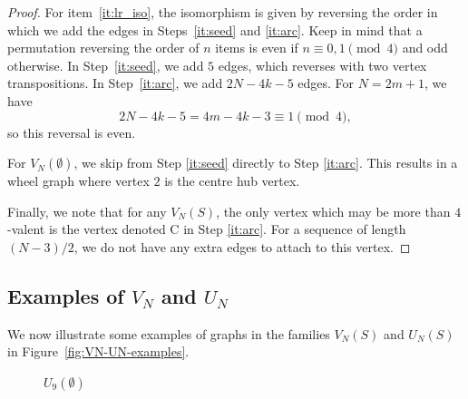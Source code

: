 \documentclass[11pt]{article}
\theoremstyle{definition}
\theoremstyle{plain}
\begin{document}
\begin{proof}


For item~\ref{it:lr_iso}, the isomorphism is given by reversing the order in which we add the edges in Steps~\ref{it:seed} and \ref{it:arc}. Keep in mind that a permutation reversing the order of $n$ items is even if $n \equiv 0,1 \pmod{4}$ and odd otherwise.
In Step~\ref{it:seed}, we add $5$ edges, which reverses with two vertex transpositions.
In Step~\ref{it:arc}, we add $2N-4k-5$ edges. For $N=2m+1$, we have
\[
2N-4k-5 = 4m-4k-3 \equiv 1 \pmod{4},
\]
so this reversal is even.
 
For $V_N(\emptyset)$, we skip from Step \ref{it:seed} directly to Step \ref{it:arc}. This results in a wheel graph where vertex $2$ is the centre hub vertex. 

Finally, we note that for any $V_N(S)$, the only vertex which may be more than $4$-valent is the vertex denoted C in Step \ref{it:arc}.
For a sequence of length $(N-3)/2$, we do not have any extra edges to attach to this vertex. 


\end{proof}

\subsection*{Examples of $V_N$ and $U_N$}

We now illustrate some examples of graphs in the families $V_N(S)$ and $U_N(S)$ in Figure~\ref{fig:VN-UN-examples}.

\begin{figure}[H]
\centering
\begin{minipage}{0.48\linewidth}
\centering
\resizebox{0.50\linewidth}{!}{}
\caption*{$V_9(\emptyset)$}
\end{minipage}\hfill
\begin{minipage}{0.48\linewidth}
\centering
\resizebox{0.50\linewidth}{!}{}
\caption*{$U_9(\emptyset)$}
\end{minipage}
\end{figure}
\end{document}
